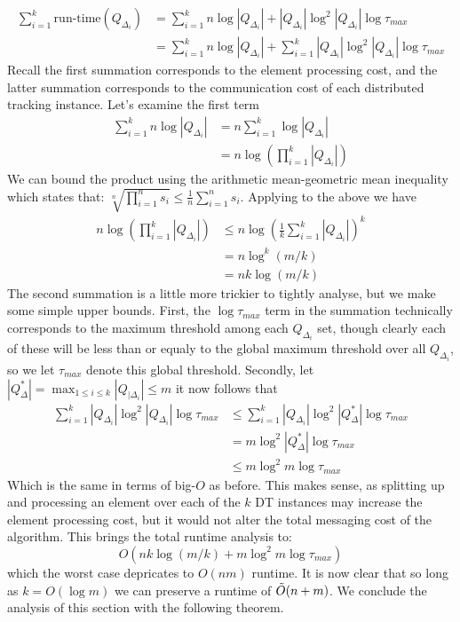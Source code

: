 \begin{align*}
\sum_{i=1}^{k}\text{run-time}(Q_{\Delta_i}) &= \sum_{i=1}^{k} n\log |Q_{\Delta_i}| + |Q_{\Delta_i}|\log^2 |Q_{\Delta_i}| \log\tau_{max} \\
&= \sum_{i=1}^{k} n\log |Q_{\Delta_i}| + \sum_{i=1}^{k}  |Q_{\Delta_i}|\log^2 |Q_{\Delta_i}| \log\tau_{max} 
\end{align*}
Recall the first summation corresponds to the element processing cost, and the latter summation corresponds to the communication cost of each distributed tracking instance. Let's examine the first term
\begin{align*}
    \sum_{i=1}^{k} n\log |Q_{\Delta_i}| &= n\sum_{i=1}^{k}\log |Q_{\Delta_i}| \\
    &= n \log \left(\prod_{i=1}^{k}|Q_{\Delta_i}| \right)
\end{align*}
We can bound the product using the arithmetic mean-geometric mean inequality which states that: 
$\sqrt[n]{\prod_{i=1}^{n} s_i} \leq \frac{1}{n}\sum_{i=1}^{n}s_i$. Applying to the above we have
\begin{align*}
     n \log \left(\prod_{i=1}^{k}|Q_{\Delta_i}| \right) &\leq n \log\left(
     \frac{1}{k}\sum_{i=1}^{k}|Q_{\Delta_i}|\right)^k \\
     &= n\log^k (m/k) \\ 
     &= nk\log (m/k)
\end{align*}
The second summation is a little more trickier to tightly analyse, but we make some simple upper bounds. First, the $\log\tau_{max}$ term in the summation technically corresponds to the maximum threshold among each $Q_{\Delta_{i}}$ set, though clearly each of these will be less than or equaly to the global maximum threshold over all $Q_{\Delta_i}$, so we let $\tau_{max}$ denote this global threshold. Secondly, let $|Q_{\Delta}^*| = \max_{1\leq i \leq k} |Q_{|\Delta_i}|\leq m$ it now follows that 
\begin{align*}
    \sum_{i=1}^{k}  |Q_{\Delta_i}|\log^2 |Q_{\Delta_i}| \log\tau_{max} &\leq \sum_{i=1}^{k}  |Q_{\Delta_i}|\log^2 |Q_{\Delta}^*| \log\tau_{max} \\
    &= m\log^2 |Q_{\Delta}^*| \log\tau_{max} \\
    &\leq m\log^2 m \log\tau_{max}
\end{align*}
Which is the same in terms of big-$O$ as before. This makes sense, as splitting up and processing an element over each of the $k$ DT instances may increase the element processing cost, but it would not alter the total messaging cost of the algorithm. This brings the total runtime analysis to: 
$$O(nk\log (m/k) + m\log^2 m \log\tau_{max})$$
which the worst case depricates to $O(nm)$ runtime. It is now clear that so long as $k = O(\log m)$ we can preserve a runtime of $\Tilde{O}(n+m)$. We conclude the analysis of this section with the following theorem. 

